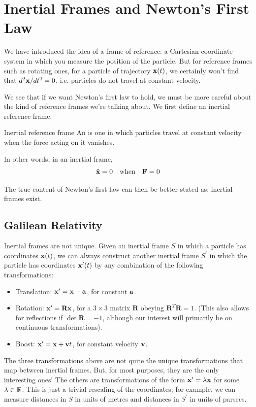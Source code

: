 \section{Inertial Frames and Newton's First Law}
We have introduced the idea of a frame of reference: a Cartesian coordinate system in which you measure the position of the particle. But for reference frames such as rotating ones, for a particle of trajectory $\vb{x}(t)$, we certainly won't find that $d^2\vb{x}/dt^2=0$, i.e. particles do not travel at constant velocity.

We see that if we want Newton's first law to hold, we must be more careful about the kind of reference frames we're talking about. We first define an inertial reference frame.

\begin{defn}{Inertial reference frame}{}
An  is one in which particles travel at constant velocity when the force acting on it vanishes. 

In other words, in an inertial frame,
\[ \ddot{\vb{x}}=0 \quad \text{when} \quad \vb{F}=0 \]
\end{defn}

The true content of Newton's first law can then be better stated as: inertial frames exist.

\subsection{Galilean Relativity}
Inertial frames are not unique. Given an inertial frame $S$ in which a particle has coordinates $\vb{x}(t)$, we can always construct another inertial frame $S^\prime$ in which the particle has coordinates $\vb{x}^\prime(t)$ by any combination of the following transformations:
\begin{itemize}
\item Translation: $\vb{x}^\prime = \vb{x} + \vb{a}$, for constant $\vb{a}$.
\item Rotation: $\vb{x}^\prime = \mathbf{R}\vb{x}$, for a $3\times3$ matrix $\mathbf{R}$ obeying $\mathbf{R}^T\mathbf{R}=1$. (This also allows for reflections if $\det\mathbf{R}=-1$, although our interest will primarily be on continuous transformations).
\item Boost: $\vb{x}^\prime = \vb{x} + \vb{v}t$, for constant velocity $\vb{v}$.
\end{itemize}

\begin{remark}
The three transformations above are not quite the unique transformations that map between inertial frames. But, for most purposes, they are the only interesting ones! The others are transformations of the form $\vb{x}^\prime=\lambda\vb{x}$ for some $\lambda\in\mathbb R$. This is just a trivial rescaling of the coordinates; for example, we can measure distances in $S$ in units of metres and distances in $S^\prime$ in units of parsecs.
\end{remark}


